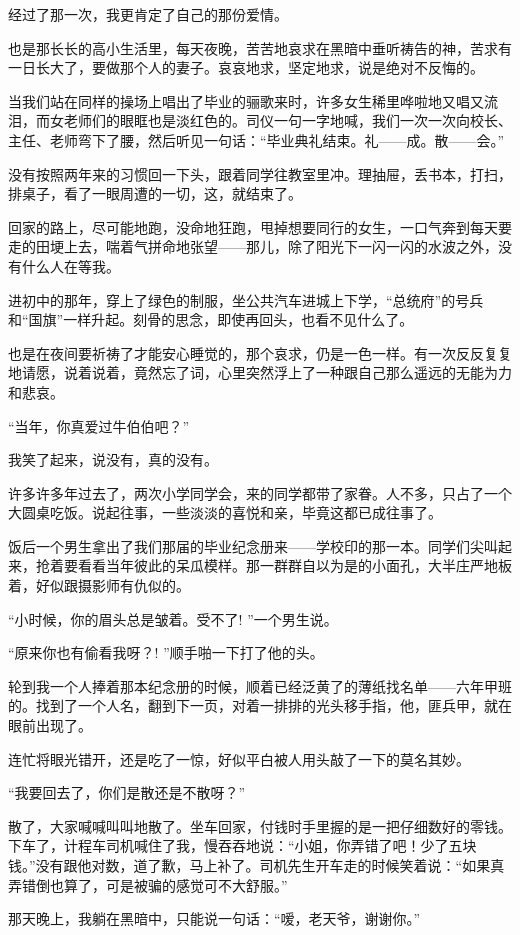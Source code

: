 \par 经过了那一次，我更肯定了自己的那份爱情。
\par 也是那长长的高小生活里，每天夜晚，苦苦地哀求在黑暗中垂听祷告的神，苦求有一日长大了，要做那个人的妻子。哀哀地求，坚定地求，说是绝对不反悔的。
\par 当我们站在同样的操场上唱出了毕业的骊歌来时，许多女生稀里哗啦地又唱又流泪，而女老师们的眼眶也是淡红色的。司仪一句一字地喊，我们一次一次向校长、主任、老师弯下了腰，然后听见一句话：“毕业典礼结束。礼——成。散——会。”
\par 没有按照两年来的习惯回一下头，跟着同学往教室里冲。理抽屉，丢书本，打扫，排桌子，看了一眼周遭的一切，这，就结束了。
\par 回家的路上，尽可能地跑，没命地狂跑，甩掉想要同行的女生，一口气奔到每天要走的田埂上去，喘着气拼命地张望——那儿，除了阳光下一闪一闪的水波之外，没有什么人在等我。
\par 进初中的那年，穿上了绿色的制服，坐公共汽车进城上下学，“总统府”的号兵和“国旗”一样升起。刻骨的思念，即使再回头，也看不见什么了。
\par 也是在夜间要祈祷了才能安心睡觉的，那个哀求，仍是一色一样。有一次反反复复地请愿，说着说着，竟然忘了词，心里突然浮上了一种跟自己那么遥远的无能为力和悲哀。
\par “当年，你真爱过牛伯伯吧？”
\par 我笑了起来，说没有，真的没有。
\par 许多许多年过去了，两次小学同学会，来的同学都带了家眷。人不多，只占了一个大圆桌吃饭。说起往事，一些淡淡的喜悦和亲，毕竟这都已成往事了。
\par 饭后一个男生拿出了我们那届的毕业纪念册来——学校印的那一本。同学们尖叫起来，抢着要看看当年彼此的呆瓜模样。那一群群自以为是的小面孔，大半庄严地板着，好似跟摄影师有仇似的。
\par “小时候，你的眉头总是皱着。受不了! ”一个男生说。
\par “原来你也有偷看我呀？! ”顺手啪一下打了他的头。
\par 轮到我一个人捧着那本纪念册的时候，顺着已经泛黄了的薄纸找名单——六年甲班的。找到了一个人名，翻到下一页，对着一排排的光头移手指，他，匪兵甲，就在眼前出现了。
\par 连忙将眼光错开，还是吃了一惊，好似平白被人用头敲了一下的莫名其妙。
\par “我要回去了，你们是散还是不散呀？”
\par 散了，大家喊喊叫叫地散了。坐车回家，付钱时手里握的是一把仔细数好的零钱。下车了，计程车司机喊住了我，慢吞吞地说：“小姐，你弄错了吧！少了五块钱。”没有跟他对数，道了歉，马上补了。司机先生开车走的时候笑着说：“如果真弄错倒也算了，可是被骗的感觉可不大舒服。”
\par 那天晚上，我躺在黑暗中，只能说一句话：“嗳，老天爷，谢谢你。”



